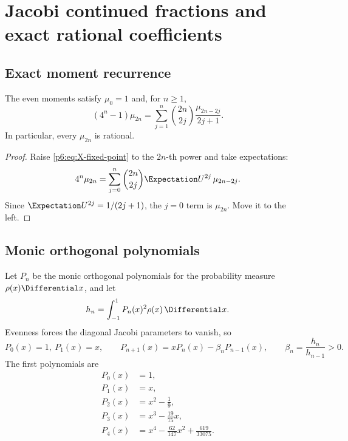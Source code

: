 \documentclass[11pt]{article}
\theoremstyle{definition}
\theoremstyle{remark}
\begin{document}
\section{Jacobi continued fractions and exact rational coefficients}\label{p6:sec:jacobi}

\subsection{Exact moment recurrence}

\begin{proposition}\label{p6:prop:moment-recurrence}
The even moments satisfy \(\mu_0=1\) and, for \(n\ge1\),
\begin{equation}
 \boxed{
 (4^n-1)\mu_{2n}
 =\sum_{j=1}^{n}\binom{2n}{2j}\frac{\mu_{2n-2j}}{2j+1}.
 }                                                           \label{p6:eq:moment-recurrence}
\end{equation}
In particular, every \(\mu_{2n}\) is rational.
\end{proposition}

\begin{proof}
Raise \eqref{p6:eq:X-fixed-point} to the \(2n\)-th power and take expectations:
\[
 4^n\mu_{2n}
 =\sum_{j=0}^{n}\binom{2n}{2j}\Expectation U^{2j}\,\mu_{2n-2j}.
\]
Since \(\Expectation U^{2j}=1/(2j+1)\), the \(j=0\) term is \(\mu_{2n}\).  Move it to the left.
\end{proof}

\subsection{Monic orthogonal polynomials}

Let \(P_n\) be the monic orthogonal polynomials for the probability measure
\(\rho(x)\Differential x\), and let
\begin{equation}
 h_n=\int_{-1}^{1}P_n(x)^2\rho(x)\,\Differential x.                    \label{p6:eq:hn}
\end{equation}
Evenness forces the diagonal Jacobi parameters to vanish, so
\begin{equation}
 P_0(x)=1,\
 P_1(x)=x,
 \qquad
 P_{n+1}(x)=xP_n(x)-\beta_nP_{n-1}(x),
 \qquad
 \beta_n=\frac{h_n}{h_{n-1}}>0.                              \label{p6:eq:monic-recurrence}
\end{equation}
The first polynomials are
\begin{align}
 P_0(x)&=1,\\
 P_1(x)&=x,\\
 P_2(x)&=x^2-\frac19,\\
 P_3(x)&=x^3-\frac{19}{75}x,\\
 P_4(x)&=x^4-\frac{62}{147}x^2+\frac{619}{33075}.
\end{align}
\end{document}
